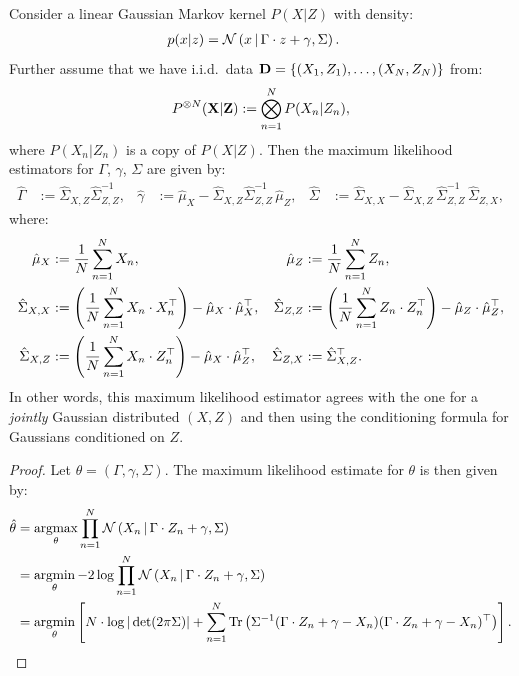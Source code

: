 \begin{Lem}
    \label{lem:mle-lin-gauss}
    Consider a linear Gaussian Markov kernel $P(X|Z)$ with density:
    \begin{align*}
        p(x|z) &=\mathcal{N}\left ( x \,\middle|\, \Gamma \cdot z + \gamma, \Sigma \right ).
    \end{align*}
    Further assume that we have i.i.d.\ data 
    $\mathbf{D}=\left \{ (X_1,Z_1),\dots,(X_N,Z_N) \right \}$ from: 
    \[ P^{\otimes N}(\mathbf{X}|\mathbf{Z}) := \bigotimes_{n=1}^N P(X_n|Z_n),  \]
    where $P(X_n|Z_n)$ is a copy of $P(X|Z)$.
    Then the maximum likelihood estimators for $\Gamma$, $\gamma$, $\Sigma$ are given by:
    \begin{align*}
        \hat \Gamma &:= \hat \Sigma_{X,Z} \hat \Sigma_{Z,Z}^{-1}, &
        \hat \gamma &:= \hat \mu_X -  \hat \Sigma_{X,Z} \hat \Sigma_{Z,Z}^{-1}\, \hat \mu_Z, &
        \hat \Sigma &:= \hat\Sigma_{X,X} -\hat\Sigma_{X,Z}\,\hat\Sigma_{Z,Z}^{-1}\,\hat\Sigma_{Z,X},
    \end{align*}
  where:
      \begin{align*}
       \hat \mu_X &:= \frac{1}{N} \sum_{n=1}^N X_n, &
       \hat \mu_Z &:= \frac{1}{N} \sum_{n=1}^N Z_n, \\
       \hat \Sigma_{X,X} &:= \left ( \frac{1}{N} \sum_{n=1}^N X_n \cdot X_n^\top \right ) - \hat \mu_X \cdot \hat \mu_X^\top, &
        \hat \Sigma_{Z,Z} &:= \left ( \frac{1}{N} \sum_{n=1}^N Z_n \cdot Z_n^\top \right ) - \hat \mu_Z \cdot \hat \mu_Z^\top,\\
        \hat \Sigma_{X,Z} &:= \left ( \frac{1}{N} \sum_{n=1}^N X_n \cdot Z_n^\top \right ) - \hat \mu_X \cdot \hat \mu_Z^\top, &
        \hat \Sigma_{Z,X} &:= \hat \Sigma_{X,Z}^\top.
    \end{align*}
    In other words, this maximum likelihood estimator agrees with the one for a \emph{jointly} Gaussian distributed $(X,Z)$
    and then using the conditioning formula for Gaussians conditioned on $Z$. %
    \begin{proof}
        Let $\theta=(\Gamma,\gamma,\Sigma)$. The maximum likelihood estimate for $\theta$ is then given by:
    \begin{align*}
        \hat \theta & =\argmax_{\theta} \prod_{n=1}^N \Ncal\lp X_n \st \Gamma \cdot Z_n + \gamma, \Sigma \rp \\
        &= \argmin_{\theta} - 2 \log  \prod_{n=1}^N \Ncal\lp X_n \st \Gamma \cdot Z_n + \gamma, \Sigma \rp \\
        &= \argmin_{\theta} \lB N \cdot \log |\det(2\pi\Sigma)| + \sum_{n=1}^N \Tr\lp \Sigma^{-1}(\Gamma \cdot Z_n + \gamma - X_n)(\Gamma \cdot Z_n + \gamma - X_n)^\top \rp \rB.

\end{align*}
\end{proof}
\end{Lem}
